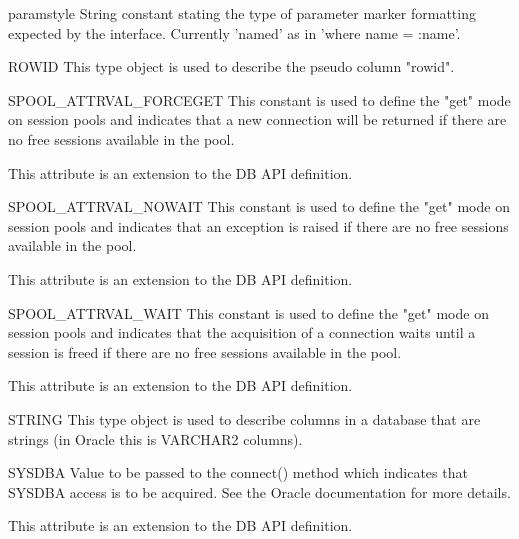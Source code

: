 \documentclass{manual}
\begin{document}
\begin{datadesc}{paramstyle}
  String constant stating the type of parameter marker formatting expected by
  the interface. Currently 'named' as in 'where name = :name'.
\end{datadesc}

\begin{datadesc}{ROWID}
  This type object is used to describe the pseudo column "rowid".
\end{datadesc}

\begin{datadesc}{SPOOL_ATTRVAL_FORCEGET}
  This constant is used to define the "get" mode on session pools and indicates
  that a new connection will be returned if there are no free sessions
  available in the pool.

   This attribute is an extension to the DB API definition.
\end{datadesc}

\begin{datadesc}{SPOOL_ATTRVAL_NOWAIT}
  This constant is used to define the "get" mode on session pools and indicates
  that an exception is raised if there are no free sessions available in the
  pool.

   This attribute is an extension to the DB API definition.
\end{datadesc}

\begin{datadesc}{SPOOL_ATTRVAL_WAIT}
  This constant is used to define the "get" mode on session pools and indicates
  that the acquisition of a connection waits until a session is freed if there
  are no free sessions available in the pool.

   This attribute is an extension to the DB API definition.
\end{datadesc}

\begin{datadesc}{STRING}
  This type object is used to describe columns in a database that are strings
  (in Oracle this is VARCHAR2 columns).
\end{datadesc}

\begin{datadesc}{SYSDBA}
  Value to be passed to the connect() method which indicates that SYSDBA
  access is to be acquired. See the Oracle documentation for more details.

   This attribute is an extension to the DB API definition.
\end{datadesc}
\end{document}
